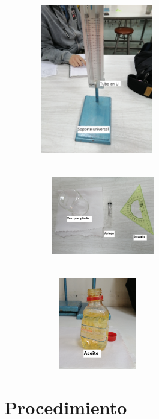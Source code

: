 \documentclass[a4paper, 12p]{article}
\begin{document}
\begin{figure}[H]
      \begin{subfigure}
            \raggedright
            \includegraphics[width=6cm, height=6.5cm]{img/image2.jpg}
      \end{subfigure}
      \begin{subfigure}
            \centering
            \includegraphics[width=4.5cm, height=4.5cm]{img/image1.jpg}   
      \end{subfigure}  
      \begin{subfigure}
            \raggedleft
            \includegraphics[width=4cm, height=4cm]{img/image3.jpg}
      \end{subfigure}
\end{figure}



\section{Procedimiento}
\end{document}

